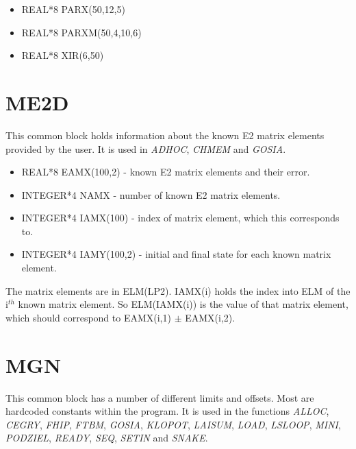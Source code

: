 \begin{itemize}
\item REAL*8 PARX(50,12,5)
\item REAL*8 PARXM(50,4,10,6)
\item REAL*8 XIR(6,50)
\end{itemize}

\section{ME2D}

This common block holds information about the known E2 matrix elements
provided by the user. It is used in \emph{ADHOC}, \emph{CHMEM} and \emph{
GOSIA}.

\begin{itemize}
\item REAL*8 EAMX(100,2) - known E2 matrix elements and their error.
\item INTEGER*4 NAMX - number of known E2 matrix elements.
\item INTEGER*4 IAMX(100) - index of matrix element, which this corresponds
to.
\item INTEGER*4 IAMY(100,2) - initial and final state for each known matrix
element.
\end{itemize}

The matrix elements are in ELM(LP2). IAMX(i) holds the index into ELM of the
i$^{th}$ known matrix element. So ELM(IAMX(i)) is the value of that matrix
element, which should correspond to EAMX(i,1) $\pm$ EAMX(i,2).

\section{MGN}

This common block has a number of different limits and offsets. Most are
hardcoded constants within the program. It is used in the functions \emph{
ALLOC}, \emph{CEGRY}, \emph{FHIP}, \emph{FTBM}, \emph{GOSIA}, \emph{KLOPOT}, \emph{
LAISUM}, \emph{LOAD}, \emph{LSLOOP}, \emph{MINI}, \emph{PODZIEL}, \emph{READY},
\emph{SEQ}, \emph{SETIN} and \emph{SNAKE}.


